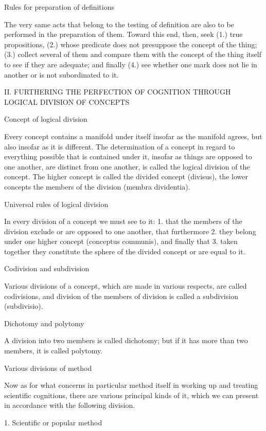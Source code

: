 Rules for preparation of definitions

The very same acts that belong to the testing of definition are
also to be performed in the preparation of them.
Toward this end, then, seek
(1.)    true propositions,
(2.)    whose predicate does not presuppose the concept of the thing;
(3.)    collect several of them and compare them with
        the concept of the thing itself
        to see if they are adequate; and finally
(4.)    see whether one mark does not lie in another
        or is not subordinated to it.

II. FURTHERING THE PERFECTION OF COGNITION
THROUGH LOGICAL DIVISION OF CONCEPTS

Concept of logical division

Every concept contains a manifold under itself
insofar as the manifold agrees,
but also insofar as it is different.
The determination of a concept in regard to
everything possible that is contained under it,
insofar as things are opposed to one another,
are distinct from one another,
is called the logical division of the concept.
The higher concept is called the divided concept (divisus),
the lower concepts the members of the division (membra dividentia).

Universal rules of logical division

In every division of a concept we must see to it:
1.  that the members of the division exclude
    or are opposed to one another,
    that furthermore
2.  they belong under one higher concept (conceptus communis),
    and finally that
3.  taken together they constitute the sphere of the divided concept
    or are equal to it.

Codivision and subdivision

Various divisions of a concept,
which are made in various respects,
are called codivisions,
and division of the members of division
is called a subdivision (subdivisio).

Dichotomy and polytomy

A division into two members is called dichotomy;
but if it has more than two members, it is called polytomy.

Various divisions of method

Now as for what concerns in particular method itself
in working up and treating scientific cognitions,
there are various principal kinds of it,
which we can present in accordance with the following division.

1. Scientific or popular method


